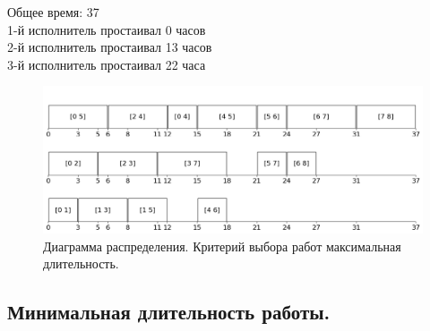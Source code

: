 \documentclass[a4paper,14pt]{extarticle}
\begin{document}
Общее время: 37 \\
1-й исполнитель простаивал 0 часов\\
2-й исполнитель простаивал 13 часов \\
3-й исполнитель простаивал 22 часа \\

\begin{figure}[H]
\centering
\includegraphics[width=1\linewidth]{diag1.png}
\caption{Диаграмма распределения. Критерий выбора работ максимальная длительность.}
\label{ris:image1}
\end{figure}


\subsection{Минимальная длительность работы.}
\end{document}
